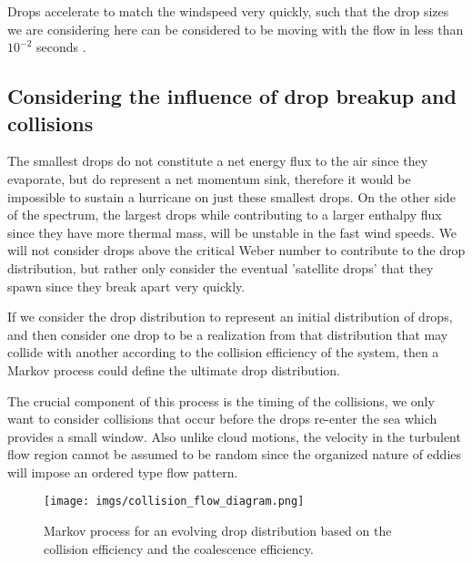 \documentclass[10pt,a4paper]{article}
\begin{document}
Drops accelerate to match the windspeed very quickly, such that the drop sizes we are considering here can be considered to be moving with the flow in less than $10^{-2}$ seconds \citep{Andreas2004}.

\subsection{Considering the influence of drop breakup and collisions}
The smallest drops do not constitute a net energy flux to the air since they evaporate, but do represent a net momentum sink, therefore it would be impossible to sustain a hurricane on just these smallest drops. On the other side of the spectrum, the largest drops while contributing to a larger enthalpy flux since they have more thermal mass, will be unstable in the fast wind speeds. We will not consider drops above the critical Weber number to contribute to the drop distribution, but rather only consider the eventual 'satellite drops' that they spawn since they break apart very quickly. 

If we consider the drop distribution to represent an initial distribution of drops, and then consider one drop to be a realization from that distribution that may collide with another according to the collision efficiency of the system, then a Markov process could define the ultimate drop distribution. 


The crucial component of this process is the timing of the collisions, we only want to consider collisions that occur before the drops re-enter the sea which provides a small window. Also unlike cloud motions, the velocity in the turbulent flow region cannot be assumed to be random since the organized nature of eddies will impose an ordered type flow pattern.
\begin{figure}[ht!]
\centering
\texttt{[image: imgs/collision\_flow\_diagram.png]}
\caption{Markov process for an evolving drop distribution based on the collision efficiency and the coalescence efficiency.}
\end{figure}
\end{document}
